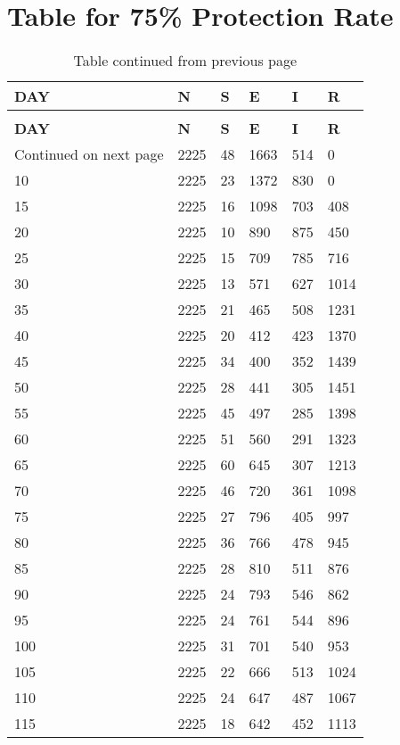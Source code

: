 \chapter{Table for 75\% Protection Rate}
\begin{longtable}{|l|l|l|l|l|l|}
	\caption{75\% Exposed Rate} \\
	
	\toprule
	\textbf{DAY} & \textbf{N} & \textbf{S} & \textbf{E }& \textbf{I} &\textbf{ R} \\
	\midrule
	\endfirsthead
	\caption*{Table continued from previous page} \\
	\toprule
	\textbf{DAY} & \textbf{N} & \textbf{S} & \textbf{E }& \textbf{I} &\textbf{ R} \\
	\midrule
	\endhead
	\midrule
	\multicolumn{1}{r}{\footnotesize Continued on next page}
	\endfoot
	\bottomrule
	\endlastfoot
5 & 2225 & 48 & 1663 & 514 & 0 \\
10 & 2225 & 23 & 1372 & 830 & 0 \\
15 & 2225 & 16 & 1098 & 703 & 408 \\
20 & 2225 & 10 & 890 & 875 & 450 \\
25 & 2225 & 15 & 709 & 785 & 716 \\
30 & 2225 & 13 & 571 & 627 & 1014 \\
35 & 2225 & 21 & 465 & 508 & 1231 \\
40 & 2225 & 20 & 412 & 423 & 1370 \\
45 & 2225 & 34 & 400 & 352 & 1439 \\
50 & 2225 & 28 & 441 & 305 & 1451 \\
55 & 2225 & 45 & 497 & 285 & 1398 \\
60 & 2225 & 51 & 560 & 291 & 1323 \\
65 & 2225 & 60 & 645 & 307 & 1213 \\
70 & 2225 & 46 & 720 & 361 & 1098 \\
75 & 2225 & 27 & 796 & 405 & 997 \\
80 & 2225 & 36 & 766 & 478 & 945 \\
85 & 2225 & 28 & 810 & 511 & 876 \\
90 & 2225 & 24 & 793 & 546 & 862 \\
95 & 2225 & 24 & 761 & 544 & 896 \\
100 & 2225 & 31 & 701 & 540 & 953 \\
105 & 2225 & 22 & 666 & 513 & 1024 \\
110 & 2225 & 24 & 647 & 487 & 1067 \\
115 & 2225 & 18 & 642 & 452 & 1113 \\

\end{longtable}
